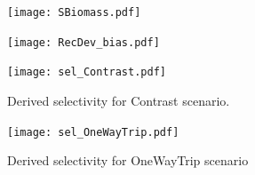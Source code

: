 \documentclass{fancyslides}
\begin{document}




\begin{frame}
\begin{center} %
\begin{figure}               
                \texttt{[image: SBiomass.pdf]}  
\end{figure}
\end{center}
\end{frame}




\begin{frame}
\begin{center} %
\begin{figure}               
                \texttt{[image: RecDev\_bias.pdf]}  
\end{figure}
\end{center}
\end{frame}





\begin{frame}
\begin{center} %
\begin{figure}               
                \texttt{[image: sel\_Contrast.pdf]}  
		\caption{Derived selectivity for Contrast scenario.}
\end{figure}
\end{center}
\end{frame}




\begin{frame}
\begin{center} %
\begin{figure}               
                \texttt{[image: sel\_OneWayTrip.pdf]}  
               \caption{Derived selectivity for  OneWayTrip scenario}
\end{figure}
\end{center}
\end{frame}
\end{document}
